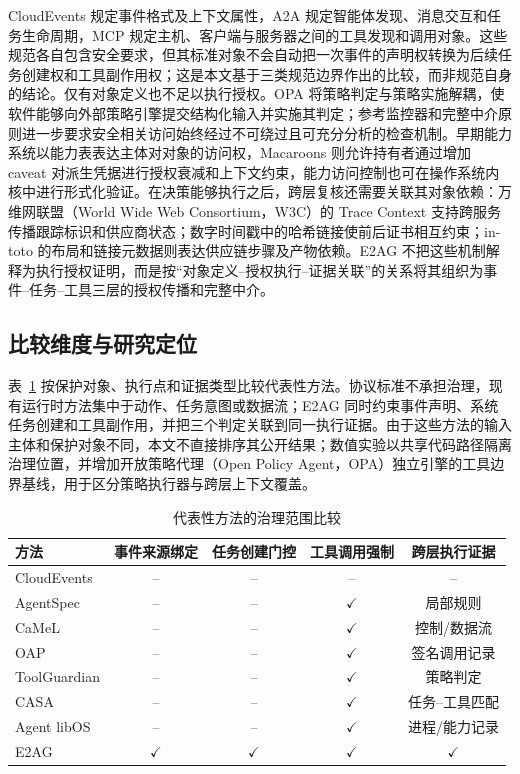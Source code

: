 CloudEvents 规定事件格式及上下文属性，A2A 规定智能体发现、消息交互和任务生命周期，MCP 规定主机、客户端与服务器之间的工具发现和调用对象\cite{cloudevents,a2a,mcp}。这些规范各自包含安全要求，但其标准对象不会自动把一次事件的声明权转换为后续任务创建权和工具副作用权；这是本文基于三类规范边界作出的比较，而非规范自身的结论。仅有对象定义也不足以执行授权。OPA 将策略判定与策略实施解耦，使软件能够向外部策略引擎提交结构化输入并实施其判定\cite{opa}；参考监控器和完整中介原则进一步要求安全相关访问始终经过不可绕过且可充分分析的检查机制\cite{reference-monitor,saltzer-schroeder}。早期能力系统以能力表表达主体对对象的访问权，Macaroons 则允许持有者通过增加 caveat 对派生凭据进行授权衰减和上下文约束，能力访问控制也可在操作系统内核中进行形式化验证\cite{dennis-capability,macaroons,cap-os}。在决策能够执行之后，跨层复核还需要关联其对象依赖：万维网联盟（World Wide Web Consortium，W3C）的 Trace Context 支持跨服务传播跟踪标识和供应商状态；数字时间戳中的哈希链接使前后证书相互约束；in-toto 的布局和链接元数据则表达供应链步骤及产物依赖\cite{trace-context,haber-stornetta,in-toto}。E2AG 不把这些机制解释为执行授权证明，而是按“对象定义--授权执行--证据关联”的关系将其组织为事件--任务--工具三层的授权传播和完整中介。

\subsection{比较维度与研究定位}

表~\ref{tab:related-scope-v11} 按保护对象、执行点和证据类型比较代表性方法。协议标准不承担治理，现有运行时方法集中于动作、任务意图或数据流；E2AG 同时约束事件声明、系统任务创建和工具副作用，并把三个判定关联到同一执行证据。由于这些方法的输入主体和保护对象不同，本文不直接排序其公开结果；数值实验以共享代码路径隔离治理位置，并增加开放策略代理（Open Policy Agent，OPA）独立引擎的工具边界基线，用于区分策略执行器与跨层上下文覆盖。

\begin{table}[htbp]
\centering
\caption{代表性方法的治理范围比较}
\label{tab:related-scope-v11}
\small
\begin{tabular}{lcccc}
\toprule
方法 & 事件来源绑定 & 任务创建门控 & 工具调用强制 & 跨层执行证据 \\
\midrule
CloudEvents & -- & -- & -- & -- \\
AgentSpec & -- & -- & $\checkmark$ & 局部规则 \\
CaMeL & -- & -- & $\checkmark$ & 控制/数据流 \\
OAP & -- & -- & $\checkmark$ & 签名调用记录 \\
ToolGuardian & -- & -- & $\checkmark$ & 策略判定 \\
CASA & -- & -- & $\checkmark$ & 任务--工具匹配 \\
Agent libOS & -- & -- & $\checkmark$ & 进程/能力记录 \\
E2AG & $\checkmark$ & $\checkmark$ & $\checkmark$ & $\checkmark$ \\
\bottomrule
\end{tabular}
\end{table}

